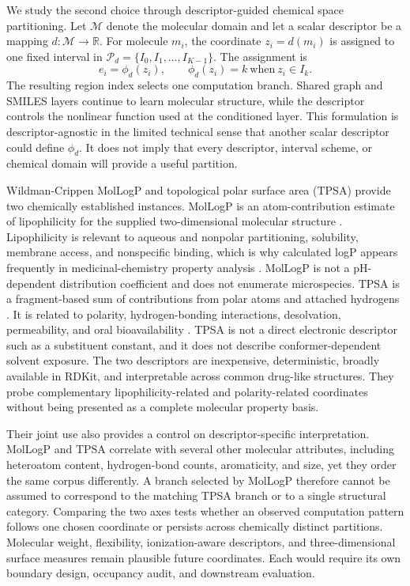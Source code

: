 \documentclass[journal=jcisd8,manuscript=article]{achemso}
\begin{document}
We study the second choice through descriptor-guided chemical space
partitioning. Let \(\mathcal{M}\) denote the molecular domain and let a scalar
descriptor be a mapping \(d:\mathcal{M}\rightarrow\mathbb{R}\). For molecule
\(m_i\), the coordinate \(z_i=d(m_i)\) is assigned to one fixed interval in
\(\mathcal{P}_d=\{I_0,I_1,\ldots,I_{K-1}\}\). The assignment is
\begin{equation}
e_i=\phi_d(z_i),
\qquad
\phi_d(z_i)=k\ \text{when}\ z_i\in I_k.
\end{equation}
The resulting region index selects one computation branch. Shared graph and
SMILES layers continue to learn molecular structure, while the descriptor
controls the nonlinear function used at the conditioned layer. This formulation
is descriptor-agnostic in the limited technical sense that another scalar
descriptor could define \(\phi_d\). It does not imply that every descriptor,
interval scheme, or chemical domain will provide a useful partition.

Wildman-Crippen MolLogP and topological polar surface area (TPSA) provide two
chemically established instances. MolLogP is an atom-contribution estimate of
lipophilicity for the supplied two-dimensional molecular structure
\cite{Wildman1999}. Lipophilicity is relevant to aqueous and nonpolar
partitioning, solubility, membrane access, and nonspecific binding, which is why
calculated logP appears frequently in medicinal-chemistry property analysis
\cite{Lipinski1997,Bickerton2012}. MolLogP is not a pH-dependent distribution
coefficient and does not enumerate microspecies. TPSA is a fragment-based sum
of contributions from polar atoms and attached hydrogens \cite{Ertl2000}. It is
related to polarity, hydrogen-bonding interactions, desolvation, permeability,
and oral bioavailability \cite{Veber2002}. TPSA is not a direct electronic
descriptor such as a substituent constant, and it does not describe
conformer-dependent solvent exposure. The two descriptors are inexpensive,
deterministic, broadly available in RDKit, and interpretable across common
drug-like structures. They probe complementary lipophilicity-related and
polarity-related coordinates without being presented as a complete molecular
property basis.

Their joint use also provides a control on descriptor-specific interpretation.
MolLogP and TPSA correlate with several other molecular attributes, including
heteroatom content, hydrogen-bond counts, aromaticity, and size, yet they order
the same corpus differently. A branch selected by MolLogP therefore cannot be
assumed to correspond to the matching TPSA branch or to a single structural
category. Comparing the two axes tests whether an observed computation pattern
follows one chosen coordinate or persists across chemically distinct
partitions. Molecular weight, flexibility, ionization-aware descriptors, and
three-dimensional surface measures remain plausible future coordinates. Each
would require its own boundary design, occupancy audit, and downstream
evaluation.
\end{document}
